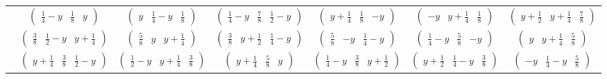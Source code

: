\documentclass[fleqn,9pt,landscape]{jsarticle}
\begin{document}
\begin{center}
\begin{longtable}{ccccccc}
& $ \begin{pmatrix} \frac{1}{4} - y & \frac{1}{8} & y \end{pmatrix} $ & $ \begin{pmatrix} y & \frac{1}{4} - y & \frac{1}{8} \end{pmatrix} $ & $ \begin{pmatrix} \frac{1}{4} - y & \frac{7}{8} & \frac{1}{2} - y \end{pmatrix} $ & $ \begin{pmatrix} y + \frac{1}{4} & \frac{1}{8} & - y \end{pmatrix} $ & $ \begin{pmatrix} - y & y + \frac{1}{4} & \frac{1}{8} \end{pmatrix} $ & $ \begin{pmatrix} y + \frac{1}{2} & y + \frac{1}{4} & \frac{7}{8} \end{pmatrix} $ \\
& $ \begin{pmatrix} \frac{3}{8} & \frac{1}{2} - y & y + \frac{1}{4} \end{pmatrix} $ & $ \begin{pmatrix} \frac{5}{8} & y & y + \frac{1}{4} \end{pmatrix} $ & $ \begin{pmatrix} \frac{3}{8} & y + \frac{1}{2} & \frac{1}{4} - y \end{pmatrix} $ & $ \begin{pmatrix} \frac{5}{8} & - y & \frac{1}{4} - y \end{pmatrix} $ & $ \begin{pmatrix} \frac{1}{4} - y & \frac{5}{8} & - y \end{pmatrix} $ & $ \begin{pmatrix} y & y + \frac{1}{4} & \frac{5}{8} \end{pmatrix} $ \\
& $ \begin{pmatrix} y + \frac{1}{4} & \frac{3}{8} & \frac{1}{2} - y \end{pmatrix} $ & $ \begin{pmatrix} \frac{1}{2} - y & y + \frac{1}{4} & \frac{3}{8} \end{pmatrix} $ & $ \begin{pmatrix} y + \frac{1}{4} & \frac{5}{8} & y \end{pmatrix} $ & $ \begin{pmatrix} \frac{1}{4} - y & \frac{3}{8} & y + \frac{1}{2} \end{pmatrix} $ & $ \begin{pmatrix} y + \frac{1}{2} & \frac{1}{4} - y & \frac{3}{8} \end{pmatrix} $ & $ \begin{pmatrix} - y & \frac{1}{4} - y & \frac{5}{8} \end{pmatrix} $ \\ \hline

\end{longtable}
\end{center}
\end{document}
